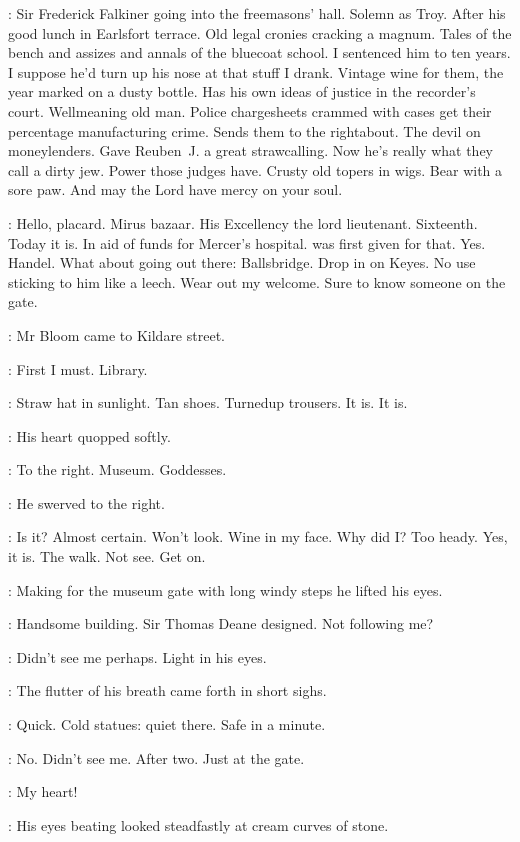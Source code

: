 \BloomInt:
Sir Frederick Falkiner going into the freemasons' hall.
Solemn as Troy.
After his good lunch in Earlsfort terrace.
Old legal cronies cracking a magnum.
Tales of the bench and assizes and annals of the bluecoat school.
I sentenced him to ten years.
I suppose he'd turn up his nose at that stuff I drank.
Vintage wine for them,
the year marked on a dusty bottle.
Has his own ideas of justice in the recorder's court.
Wellmeaning old man.
Police chargesheets crammed with cases get their percentage manufacturing crime.
Sends them to the rightabout.
The devil on moneylenders.
Gave Reuben~J. a great strawcalling.
Now he's really what they call a dirty jew.
Power those judges have.
Crusty old topers in wigs.
Bear with a sore paw.
And may the Lord have mercy on your soul.

\BloomInt:
Hello, placard.
Mirus bazaar.
His Excellency the lord lieutenant.
Sixteenth.
Today it is.
In aid of funds for Mercer's hospital.
 was first given for that.
Yes.
Handel.
What about going out there:
Ballsbridge.
Drop in on Keyes.
No use sticking to him like a leech.
Wear out my welcome.
Sure to know someone on the gate.

:
Mr Bloom came to Kildare street.

\BloomInt:
First I must.
Library.

\BloomInt:
Straw hat in sunlight.
Tan shoes.
Turnedup trousers.
It is.
It is.

:
His heart quopped softly.

\BloomInt:
To the right.
Museum.
Goddesses.

:
He swerved to the right.%

\BloomInt:
Is it?
Almost certain.
Won't look.
Wine in my face.
Why did I?
Too heady.
Yes,
it is.
The walk.
Not see.
Get on.

:
Making for the museum gate with long windy steps he lifted his eyes.

\BloomInt:
Handsome building.
Sir Thomas Deane designed.
Not following me?

\BloomInt:
Didn't see me perhaps.
Light in his eyes.

:
The flutter of his breath came forth in short sighs.

\BloomInt:
Quick.
Cold statues:
quiet there.
Safe in a minute.

\BloomInt:
No.
Didn't see me.
After two.
Just at the gate.

\BloomInt:
My heart!

:
His eyes beating looked steadfastly at cream curves of stone.

